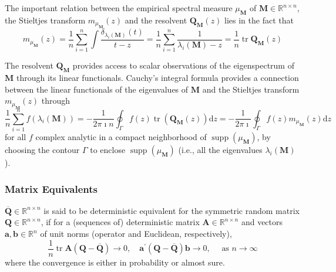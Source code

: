 \begin{remark}
    The important relation between the empirical spectral measure $\mu_{\mathbf{M}}$ of $\mathbf{M}\in\mathbb{R}^{n\times n}$, the Stieltjes transform $m_{\mu_{\mathbf{M}}}(z)$ and the resolvent $\mathbf{Q}_{\mathbf{M}}(z)$ lies in the fact that
    \begin{equation} \label{eq:relation-between-empirical-spectral-measures-stieltjes-transform-and-its-resolvent}
        m_{\mu_{\mathbf{M}}}(z)=\frac{1}{n}\sum_{i=1}^{n}\int\frac{\delta_{\lambda_{i}(\mathbf{M})}(t)}{t-z}=\frac{1}{n}\sum_{i=1}^{n}\frac{1}{\lambda_{i}(\mathbf{M})-z}=\frac{1}{n}\operatorname{tr}\mathbf{Q}_{\mathbf{M}}(z)
    \end{equation}
\end{remark}

The resolvent $\mathbf{Q}_{\mathbf{M}}$ provides access to scalar observations of the eigenspectrum of $\mathbf{M}$ through its linear functionals. Cauchy’s integral formula provides a connection between the linear functionals of the eigenvalues of $\mathbf{M}$ and the Stieltjes transform $m_{\mu_{\mathbf{M}}}(z)$ through
\begin{equation}
    \frac{1}{n}\sum_{i=1}^{n}f\left(\lambda_{i}(\mathbf{M})\right)=-\frac{1}{2\pi\imath n}\oint_{\Gamma}f(z)\operatorname{tr}\left(\mathbf{Q}_{\mathbf{M}}(z)\right)\mathrm{d}z=-\frac{1}{2\pi\imath }\oint_{\Gamma}f(z)m_{\mu_{\mathbf{M}}}(z)\mathrm{d}z
\end{equation}
for all $f$ complex analytic in a compact neighborhood of $\operatorname{supp}\left(\mu_{\mathbf{M}}\right)$, by choosing the contour $\Gamma$ to enclose $\operatorname{supp}\left(\mu_{\mathbf{M}}\right)$ (i.e., all the eigenvalues $\lambda_{i}(\mathbf{M})$).

\subsubsection{Matrix Equivalents}

\begin{definition}
    $\overline{\mathbf{Q}}\in\mathbb{R}^{n\times n}$ is said to be deterministic equivalent for the symmetric random matrix $\mathbf{Q}\in\mathbb{R}^{n\times n}$, if for a (sequences of) deterministic matrix $\mathbf{A}\in\mathbb{R}^{n\times n}$ and vectors $\mathbf{a},\mathbf{b}\in\mathbb{R}^{n}$ of unit norms (operator and Euclidean, respectively),
    \begin{equation}
        \frac{1}{n}\operatorname{tr}\mathbf{A}(\mathbf{Q}-\overline{\mathbf{Q}})\rightarrow 0,\quad\mathbf{a}^{\prime}(\mathbf{Q}-\overline{\mathbf{Q}})\mathbf{b}\rightarrow 0,\quad\text{ as }n\rightarrow\infty
    \end{equation}
    where the convergence is either in probability or almost sure.
\end{definition}

